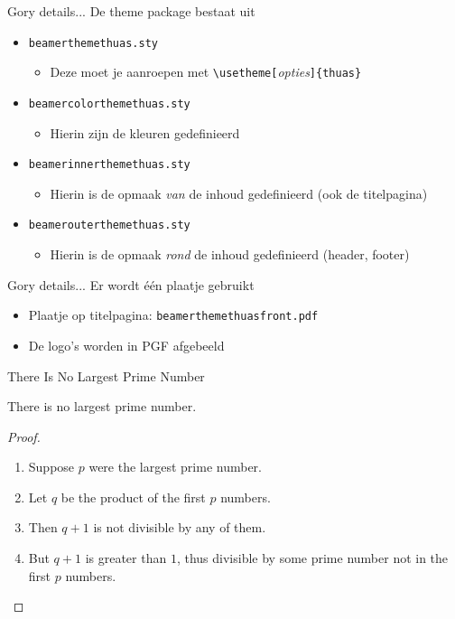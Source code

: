 \documentclass[fleqn,aspectratio=169,dutch,10pt]{beamer}
\begin{document}
\begin{frame}[fragile]{Gory details...}
De theme package bestaat uit
\begin{itemize}
\item \texttt{beamerthemethuas.sty}
\begin{itemize}
\item Deze moet je aanroepen met \lstinline|\usetheme[|\textsl{opties}\lstinline|]{thuas}|
\end{itemize}
\item \texttt{beamercolorthemethuas.sty}
\begin{itemize}
\item Hierin zijn de kleuren gedefinieerd
\end{itemize}
\item \texttt{beamerinnerthemethuas.sty}
\begin{itemize}
\item Hierin is de opmaak \emph{van} de inhoud gedefinieerd (ook de titelpagina)
\end{itemize}
\item \texttt{beamerouterthemethuas.sty}
\begin{itemize}
\item Hierin is de opmaak \emph{rond} de inhoud gedefinieerd (header, footer)
\end{itemize}
\end{itemize}
\end{frame}


\begin{frame}[fragile]{Gory details...}
Er wordt \'e\'en plaatje gebruikt
\begin{itemize}
\item Plaatje op titelpagina: \lstinline|beamerthemethuasfront.pdf|
\item De logo's worden in PGF afgebeeld
\end{itemize}
\end{frame}


\begin{frame}{There Is No Largest Prime Number} 
\begin{theorem}
There is no largest prime number.
\end{theorem} 
\begin{proof}
\begin{enumerate} 
\item<1-| alert@1> Suppose $p$ were the largest prime number. 
\item<2-> Let $q$ be the product of the first $p$ numbers. 
\item<3-> Then $q+1$ is not divisible by any of them. 
\item<1-> But $q + 1$ is greater than $1$, thus divisible by some prime
number not in the first $p$ numbers.
\end{enumerate}
\end{proof}
\end{frame}
\end{document}
